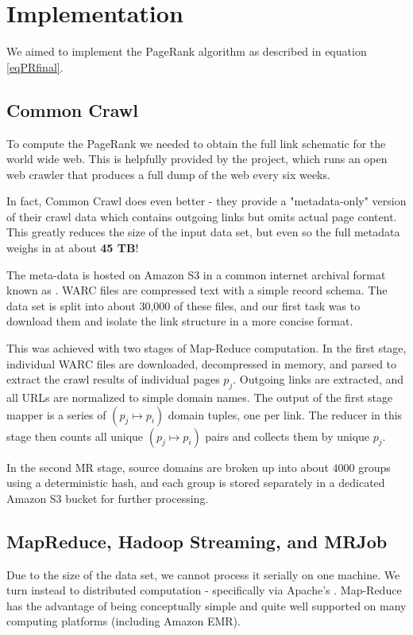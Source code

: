 \section{Implementation} \label{sec:impl}

We aimed to implement the PageRank algorithm as described in equation \eqref{eqPRfinal}.
    
\subsection{Common Crawl}
To compute the PageRank we needed to obtain the full link schematic for the 
world wide web.  This is helpfully provided by the  project,
which runs an open web crawler that produces a full dump of the web every six
weeks.

In fact, Common Crawl does even better - they provide a "metadata-only" version of
their crawl data which contains outgoing links but omits actual page content.
This greatly reduces the size of the input data set, but even so the full metadata
weighs in at about \textbf{45 TB}!

The meta-data is hosted on Amazon S3 in a common internet archival format known 
as .  WARC files are compressed text with a simple record schema.
The data set is split into about 30,000 of these files, and our first task was
to download them and isolate the link structure in a more concise format.

This was achieved with two stages of Map-Reduce computation.  In the first stage,
individual WARC files are downloaded, decompressed in memory, and parsed to
extract the crawl results of individual pages $p_j$.  Outgoing links are 
extracted, and all URLs are normalized to simple domain names.
The output of the first stage mapper is a series of $(p_j \mapsto p_i)$ 
domain tuples, one per link.  The reducer in this stage then counts all unique
$(p_j \mapsto p_i)$ pairs and collects them by unique $p_j$. 

In the second MR stage, source domains are broken up into about $4000$ groups using
a deterministic hash, and each group is stored separately in a dedicated Amazon
S3 bucket for further processing.

\subsection{MapReduce, Hadoop Streaming, and MRJob}
Due to the size of the data set, we cannot process it serially on one machine.
We turn instead to distributed computation - specifically  via 
Apache's .  Map-Reduce has the advantage of being conceptually 
simple and quite well supported on many computing platforms (including Amazon EMR).

